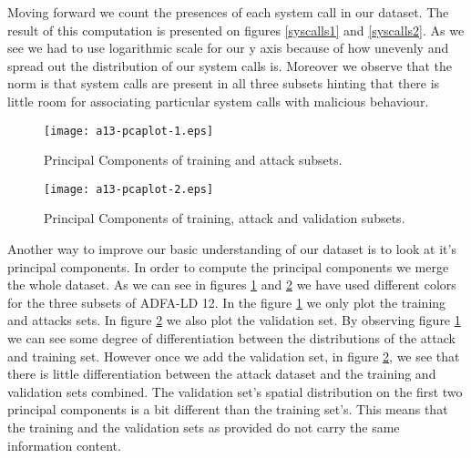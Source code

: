 \documentclass[reqno,openany,12pt]{amsbook}
\begin{document}
Moving forward we count the presences of each system call in our dataset. The result of this computation is presented on figures \ref{syscalls1} and \ref{syscalls2}. As we see we had to use logarithmic scale for our y axis because of how unevenly and spread out the distribution of our system calls is. Moreover we observe that the norm is that system calls are present in all three subsets hinting that there is little room for associating particular system calls with malicious behaviour.

\begin{figure}
\texttt{[image: a13-pcaplot-1.eps]}
\caption{Principal Components of training and attack subsets.}
\label{pca1}
\end{figure}
\begin{figure}
\texttt{[image: a13-pcaplot-2.eps]}
\caption{Principal Components of training, attack and validation subsets.}
\label{pca2}
\end{figure}

Another way to improve our basic understanding of our dataset is to look at it's principal components. In order to compute the principal components we merge the whole dataset. As we can see in figures \ref{pca1} and \ref{pca2} we have used different colors for the three subsets of ADFA-LD 12. In the figure \ref{pca1} we only plot the training and attacks sets. In figure \ref{pca2} we also plot the validation set. By observing figure \ref{pca1} we can see some degree of differentiation between the distributions of the attack and training set. However once we add the validation set, in figure \ref{pca2}, we see that there is little differentiation between the attack dataset and the training and validation sets combined. The validation set's spatial distribution on the first two principal components is a bit different than the training set's.
This means 
that the training and the validation sets as provided do not carry the same information content. 
\end{document}
